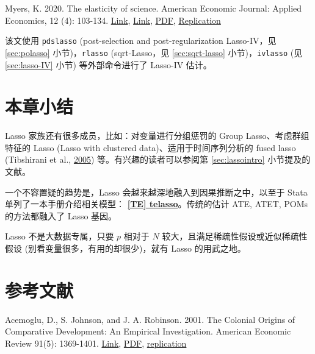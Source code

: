{Myers, K. 2020. The elasticity of science. American Economic Journal: Applied Economics, 12 (4): 103-134. \href{https://doi.org/10.1257/app.20180518}{Link}, \href{https://www.aeaweb.org/articles?id=10.1257/app.20180518}{Link}, \href{http://sci-hub.ren/10.1257/app.20180518}{PDF}, \href{https://www.aeaweb.org/doi/10.1257/app.20180518.data}{Replication}

该文使用 \texttt{pdslasso} (post-selection and post-regularization Lasso-IV，见 \ref{sec:polasso} 小节)，\texttt{rlasso} (sqrt-Lasso，见 \ref{sec:sqrt-lasso} 小节)，\texttt{ivlasso} (见 \ref{sec:lasso-IV} 小节) 等外部命令进行了 Lasso-IV 估计。
  


\section{本章小结}

Lasso 家族还有很多成员，比如：对变量进行分组惩罚的 Group Lasso、考虑群组特征的 Lasso (Lasso with clustered data)、适用于时间序列分析的 fused lasso (Tibshirani et al., \href{http://sci-hub.ren/10.1111/J.1467-9868.2005.00490.X}{2005}) 等。有兴趣的读者可以参阅第 \ref{sec:lassointro} 小节提及的文献。

一个不容置疑的趋势是，Lasso 会越来越深地融入到因果推断之中，以至于 Stata 单列了一本手册介绍相关模型： \href{https://www.stata.com/manuals/tetelasso.pdf}{\bfseries{[\MakeUppercase{te}] telasso}}。传统的估计 ATE, ATET, POMs 的方法都融入了 Lasso 基因。

Lasso 不是大数据专属，只要 $p$ 相对于 $N$ 较大，且满足稀疏性假设或近似稀疏性假设 (别看变量很多，有用的却很少)，就有  Lasso  的用武之地。




%
%




\section{参考文献}
\small

Acemoglu, D., S. Johnson, and J. A. Robinson. 2001. The Colonial Origins of Comparative Development: An Empirical Investigation. American Economic Review 91(5): 1369-1401. \href{https://www.aeaweb.org/articles?id=10.1257/aer.91.5.1369}{Link},  \href{http://sci-hub.ren/10.1257/aer.91.5.1369}{PDF}, \href{http://economics.mit.edu/faculty/acemoglu/data/ajr2001}{replication}

}
